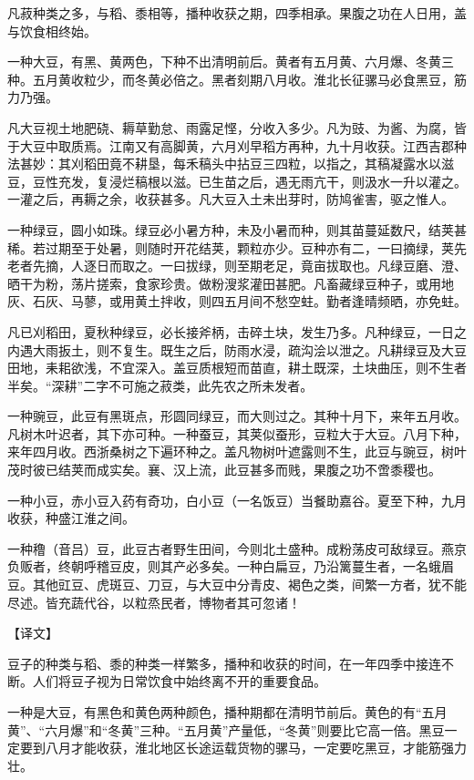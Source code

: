 \documentclass[12pt,UTF8]{ctexbook}
\begin{document}
凡菽种类之多，与稻、黍相等，播种收获之期，四季相承。果腹之功在人日用，盖与饮食相终始。

一种大豆，有黑、黄两色，下种不出清明前后。黄者有五月黄、六月爆、冬黄三种。五月黄收粒少，而冬黄必倍之。黑者刻期八月收。淮北长征骡马必食黑豆，筋力乃强。

凡大豆视土地肥硗、耨草勤怠、雨露足悭，分收入多少。凡为豉、为酱、为腐，皆于大豆中取质焉。江南又有高脚黄，六月刈早稻方再种，九十月收获。江西吉郡种法甚妙：其刈稻田竟不耕垦，每禾稿头中拈豆三四粒，以指之，其稿凝露水以滋豆，豆性充发，复浸烂稿根以滋。已生苗之后，遇无雨亢干，则汲水一升以灌之。一灌之后，再耨之余，收获甚多。凡大豆入土未出芽时，防鸠雀害，驱之惟人。

一种绿豆，圆小如珠。绿豆必小暑方种，未及小暑而种，则其苗蔓延数尺，结荚甚稀。若过期至于处暑，则随时开花结荚，颗粒亦少。豆种亦有二，一曰摘绿，荚先老者先摘，人逐日而取之。一曰拔绿，则至期老足，竟亩拔取也。凡绿豆磨、澄、晒干为粉，荡片搓索，食家珍贵。做粉溲浆灌田甚肥。凡畜藏绿豆种子，或用地灰、石灰、马蓼，或用黄土拌收，则四五月间不愁空蛀。勤者逢晴频晒，亦免蛀。

凡已刈稻田，夏秋种绿豆，必长接斧柄，击碎土块，发生乃多。凡种绿豆，一日之内遇大雨扳土，则不复生。既生之后，防雨水浸，疏沟浍以泄之。凡耕绿豆及大豆田地，耒耜欲浅，不宜深入。盖豆质根短而苗直，耕土既深，土块曲压，则不生者半矣。“深耕”二字不可施之菽类，此先农之所未发者。

一种豌豆，此豆有黑斑点，形圆同绿豆，而大则过之。其种十月下，来年五月收。凡树木叶迟者，其下亦可种。一种蚕豆，其荚似蚕形，豆粒大于大豆。八月下种，来年四月收。西浙桑树之下遍环种之。盖凡物树叶遮露则不生，此豆与豌豆，树叶茂时彼已结荚而成实矣。襄、汉上流，此豆甚多而贱，果腹之功不啻黍稷也。

一种小豆，赤小豆入药有奇功，白小豆（一名饭豆）当餐助嘉谷。夏至下种，九月收获，种盛江淮之间。

一种穞（音吕）豆，此豆古者野生田间，今则北土盛种。成粉荡皮可敌绿豆。燕京负贩者，终朝呼稽豆皮，则其产必多矣。一种白扁豆，乃沿篱蔓生者，一名蛾眉豆。其他豇豆、虎斑豆、刀豆，与大豆中分青皮、褐色之类，间繁一方者，犹不能尽述。皆充蔬代谷，以粒烝民者，博物者其可忽诸！

【译文】

豆子的种类与稻、黍的种类一样繁多，播种和收获的时间，在一年四季中接连不断。人们将豆子视为日常饮食中始终离不开的重要食品。

一种是大豆，有黑色和黄色两种颜色，播种期都在清明节前后。黄色的有“五月黄”、“六月爆”和“冬黄”三种。“五月黄”产量低，“冬黄”则要比它高一倍。黑豆一定要到八月才能收获，淮北地区长途运载货物的骡马，一定要吃黑豆，才能筋强力壮。
\end{document}

